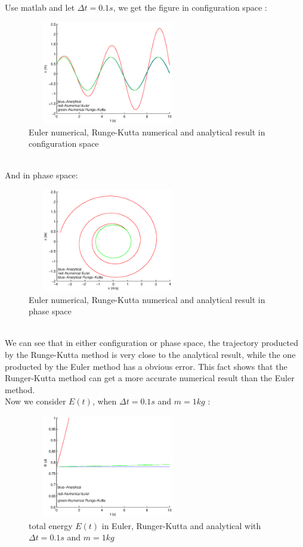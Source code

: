 \documentclass{article}
\begin{document}
\subsection{}
Use matlab and let $\Delta t=0.1s$, we get the figure in configuration space :
\begin{figure}[!htb]
	\begin{center}
		\includegraphics[height=4.5cm,width=7cm]{Problem5RKconfiguration}
	\end{center}
	\caption{Euler numerical, Runge-Kutta numerical and analytical result in configuration space}
\end{figure}
\\And in phase space:
\begin{figure}[!htb]
	\begin{center}
		\includegraphics[height=4.5cm,width=7cm]{Problem5RKphase}
	\end{center}
	\caption{Euler numerical, Runge-Kutta numerical and analytical result in phase space}
\end{figure}
\\\indent We can see that in either configuration or phase space, the trajectory producted by the Runge-Kutta method is very close to the analytical result, while the one producted by the Euler method has a obvious error. This fact shows that the Runger-Kutta method can get a more accurate numerical result than the Euler method.
\\Now we consider $E(t)$, when $\Delta t=0.1s$ and $m=1kg$ :
\begin{figure}[!htb]
	\begin{center}
		\includegraphics[height=4.5cm,width=7cm]{Problem5energy}
	\end{center}
	\caption{total energy $E(t)$ in Euler, Runger-Kutta and analytical with $\Delta t=0.1s$ and $m=1kg$}
\end{figure}
\end{document}
